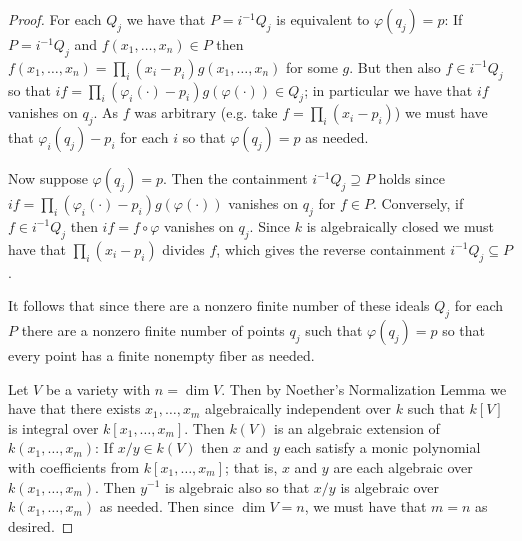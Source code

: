\documentclass[11pt]{article}
\begin{document}
\begin{enumerate}
\begin{proof}
        For each $Q_j$ we have that $P = i^{-1}Q_j$ is equivalent to $\varphi(q_j)=p$: If $P = i^{-1}Q_j$ and $f(x_1,\dots,x_n)\in P$ then $f(x_1,\dots,x_n) = \prod_i(x_i-p_i)g(x_1,\dots,x_n)$ for some $g$. But then also $f\in i^{-1}Q_j$ so that $if = \prod_i(\varphi_i(\cdot)-p_i)g(\varphi(\cdot))\in Q_j$; in particular we have that $if$ vanishes on $q_j$. As $f$ was arbitrary (e.g. take $f = \prod_i(x_i-p_i)$) we must have that $\varphi_i(q_j)-p_i$ for each $i$ so that $\varphi(q_j) = p$ as needed.
        
        Now suppose $\varphi(q_j) = p$. Then the containment $i^{-1}Q_j\supseteq P$ holds since $if=\prod_i(\varphi_i(\cdot)-p_i)g(\varphi(\cdot))$ vanishes on $q_j$ for $f\in P$. Conversely, if $f\in i^{-1}Q_j$ then $if=f\circ \varphi$ vanishes on $q_j$. Since $k$ is algebraically closed we must have that $\prod_i(x_i-p_i)$ divides $f$, which gives the reverse containment $i^{-1}Q_j\subseteq P$.

        It follows that since there are a nonzero finite number of these ideals $Q_j$ for each $P$ there are a nonzero finite number of points $q_j$ such that $\varphi(q_j) = p$ so that every point has a finite nonempty fiber as needed.

        Let $V$ be a variety with $n = \dim V$. Then by Noether's Normalization Lemma we have that there exists $x_1,\dots,x_m$ algebraically independent over $k$ such that $k[V]$ is integral over $k[x_1,\dots,x_m]$. Then $k(V)$ is an algebraic extension of $k(x_1,\dots,x_m)$: If $x/y\in k(V)$ then $x$ and $y$ each satisfy a monic polynomial with coefficients from $k[x_1,\dots,x_m]$; that is, $x$ and $y$ are each algebraic over $k(x_1,\dots,x_m)$. Then $y^{-1}$ is algebraic also so that $x/y$ is algebraic over $k(x_1,\dots,x_m)$ as needed. Then since $\dim V =n$, we must have that $m= n$ as desired.
    \end{proof}
\end{enumerate}
\end{document}
